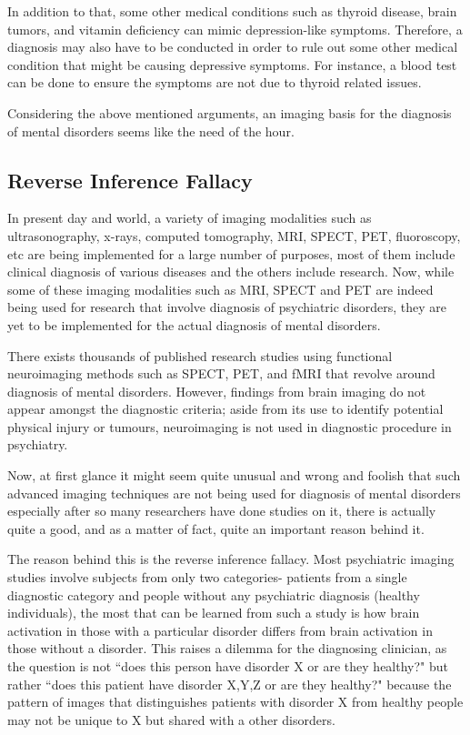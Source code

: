 \documentclass{article}
\begin{document}
In addition to that, some other medical conditions such as thyroid
disease, brain tumors, and vitamin deficiency can mimic
depression-like symptoms\cite{externalfactorsinMDD}. Therefore, a
diagnosis may also have to be conducted in order to rule out some
other medical condition that might be causing depressive symptoms. For
instance, a blood test can be done to ensure the symptoms are not due
to thyroid related issues.

Considering the above mentioned arguments, an imaging basis for the
diagnosis of mental disorders seems like the need of the hour.

\newpage
\subsection{Reverse Inference Fallacy}

In present day and world, a variety of imaging modalities such as
ultrasonography, x-rays, computed tomography, MRI, SPECT, PET,
fluoroscopy, etc are being implemented for a large number of purposes,
most of them include clinical diagnosis of various diseases and the
others include research. Now, while some of these imaging modalities
such as MRI, SPECT and PET are indeed being used for research that
involve diagnosis of psychiatric disorders, they are yet to be
implemented for the actual diagnosis of mental disorders.

There exists thousands of published research studies using functional
neuroimaging methods such as SPECT, PET, and fMRI that revolve around
diagnosis of mental disorders. However, findings from brain imaging do
not appear amongst the diagnostic criteria; aside from its use to
identify potential physical injury or tumours, neuroimaging is not
used in diagnostic procedure in psychiatry.

Now, at first glance it might seem quite unusual and wrong and foolish
that such advanced imaging techniques are not being used for diagnosis
of mental disorders especially after so many researchers have done
studies on it, there is actually quite a good, and as a matter of
fact, quite an important reason behind it.

The reason behind this is the reverse inference fallacy. Most
psychiatric imaging studies involve subjects from only two categories-
patients from a single diagnostic category and people without any
psychiatric diagnosis (healthy individuals), the most that can be
learned from such a study is how brain activation in those with a
particular disorder differs from brain activation in those without a
disorder. This raises a dilemma for the diagnosing clinician, as the
question is not ``does this person have disorder X or are they
healthy?" but rather ``does this patient have disorder X,Y,Z or are
they healthy?" because the pattern of images that distinguishes
patients with disorder X from healthy people may not be unique to X
but shared with a other disorders.
\end{document}
